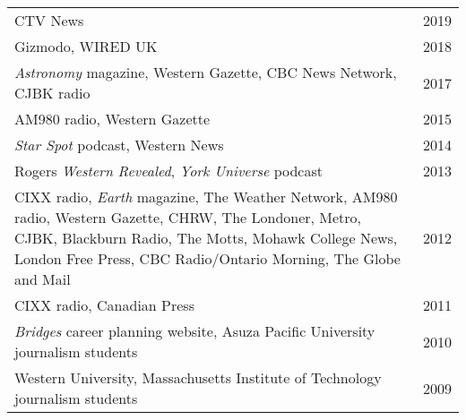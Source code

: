 \begin{tabularx}{\textwidth}{Xr}
CTV News & 2019\\
Gizmodo, WIRED UK &2018\\
{\em Astronomy} magazine, Western Gazette, CBC News Network, CJBK radio & 2017\\
AM980 radio, Western Gazette & 2015\\
{\em Star Spot} podcast, Western News & 2014\\
Rogers {\em Western Revealed}, {\em York Universe} podcast & 2013\\
CIXX radio, {\em Earth} magazine, The Weather Network, AM980 radio, Western Gazette, CHRW, The Londoner, Metro, CJBK, Blackburn Radio, The Motts, Mohawk College News, London Free Press, CBC Radio/Ontario Morning, The Globe and Mail& 2012\\
CIXX radio, Canadian Press&  2011\\
{\em Bridges} career planning website, Asuza Pacific University journalism students& 2010\\
Western University, Massachusetts Institute of Technology journalism students& 2009\\
\end{tabularx}
